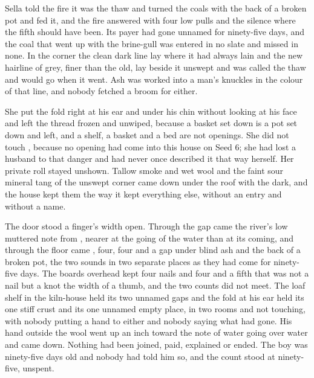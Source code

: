 Sella told the fire it was the thaw and turned the coals with the back of a broken pot and fed it, and the fire answered with four low pulls and the silence where the fifth should have been. Its payer had gone unnamed for ninety-five days, and the coal that went up with the brine-gull was entered in no slate and missed in none. In the corner the clean dark line lay where it had always lain and the new hairline of grey, finer than the old, lay beside it unswept and was called the thaw and would go when it went. Ash was worked into a man's knuckles in the colour of that line, and nobody fetched a broom for either.

She put the fold right at his ear and under his chin without looking at his face and left the thread frozen and unwiped, because a basket set down is a pot set down and left, and a shelf, a basket and a bed are not openings. She did not touch , because no opening had come into this house on Seed 6; she had lost a husband to that danger and had never once described it that way herself. Her private roll stayed unshown. Tallow smoke and wet wool and the faint sour mineral tang of the unswept corner came down under the roof with the dark, and the house kept them the way it kept everything else, without an entry and without a name.

The door stood a finger's width open. Through the gap came the river's low muttered note from , nearer at the going of the water than at its coming, and through the floor came , four, four and a gap under blind ash and the back of a broken pot, the two sounds in two separate places as they had come for ninety-five days. The boards overhead kept four nails and four and a fifth that was not a nail but a knot the width of a thumb, and the two counts did not meet. The loaf shelf in the kiln-house held its two unnamed gaps and the fold at his ear held its one stiff crust and its one unnamed empty place, in two rooms and not touching, with nobody putting a hand to either and nobody saying what had gone. His hand outside the wool went up an inch toward the note of water going over water and came down. Nothing had been joined, paid, explained or ended. The boy was ninety-five days old and nobody had told him so, and the count stood at ninety-five, unspent.
